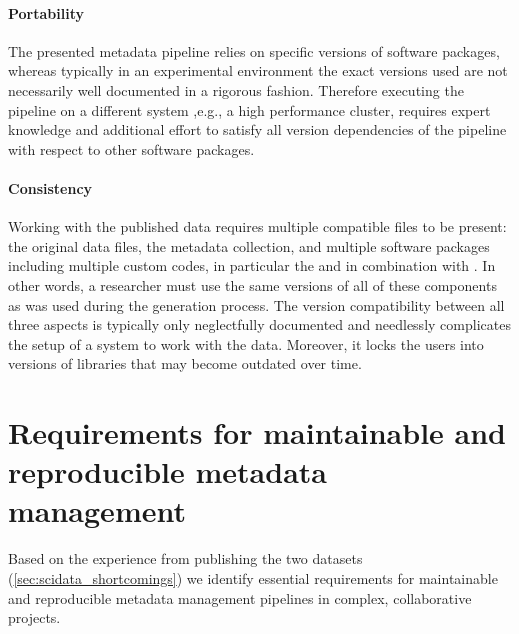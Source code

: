 \paragraph{Portability} The presented metadata pipeline relies on specific versions of software packages, whereas typically in an experimental environment the exact versions used are not necessarily well documented in a rigorous fashion. Therefore executing the pipeline on a different system ,e.g., a high performance cluster, requires expert knowledge and additional effort to satisfy all version dependencies of the pipeline with respect to other software packages.

\paragraph{Consistency} Working with the published data requires multiple compatible files to be present: the original data files, the metadata collection, and multiple software packages including multiple custom codes, in particular the  and  in combination with . In other words, a researcher must use the same versions of all of these components as was used during the  generation process. The version compatibility between all three aspects is typically only neglectfully documented and needlessly complicates the setup of a system to work with the data. Moreover, it locks the users into versions of libraries that may become outdated over time.



\section{Requirements for maintainable and reproducible metadata management}
\label{sec:metadata_requirements}
Based on the experience from publishing the two datasets (\cref{sec:scidata_shortcomings}) we identify essential requirements for maintainable and reproducible metadata management pipelines in complex, collaborative projects.

